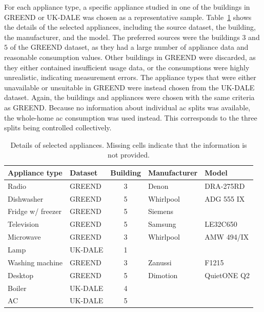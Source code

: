 For each appliance type, a specific appliance studied in one of the buildings in GREEND or UK-DALE was chosen as a representative sample. Table~\ref{tab:appliances_details} shows the details of the selected appliances, including the source dataset, the building, the manufacturer, and the model. The preferred sources were the buildings $3$ and $5$ of the GREEND dataset, as they had a large number of appliance data and reasonable consumption values. Other buildings in GREEND were discarded, as they either contained insufficient usage data, or the consumptions were highly unrealistic, indicating measurement errors. The appliance types that were either unavailable or unsuitable in GREEND were instead chosen from the UK-DALE dataset. Again, the buildings and appliances were chosen with the same criteria as GREEND. Because no information about individual \acrshort{ac} splits was available, the whole-home \acrshort{ac} consumption was used instead. This corresponds to the three splits being controlled collectively.

\begin{table}
  \centering
  \begin{tabular}{llcll}
    \hline
    \textbf{Appliance type} & \textbf{Dataset} & \textbf{Building} & \textbf{Manufacturer} & \textbf{Model} \\ \hline
    Radio                   & GREEND           & 3                 & Denon                 & DRA-275RD      \\
    Dishwasher              & GREEND           & 5                 & Whirlpool             & ADG 555 IX     \\
    Fridge w/ freezer       & GREEND           & 5                 & Siemens               &                \\
    Television              & GREEND           & 5                 & Samsung               & LE32C650       \\
    Microwave               & GREEND           & 3                 & Whirlpool             & AMW 494/IX     \\
    Lamp                    & UK-DALE          & 1                 &                       &                \\
    Washing machine         & GREEND           & 3                 & Zanussi               & F1215          \\
    Desktop                 & GREEND           & 5                 & Dimotion              & QuietONE Q2    \\
    Boiler                  & UK-DALE          & 4                 &                       &                \\
    AC                      & UK-DALE          & 5                 &                       &                \\ \hline
  \end{tabular}%
  \caption[Details of selected appliances]{Details of selected appliances. Missing cells indicate that the information is not provided.}
  \label{tab:appliances_details}
\end{table}

